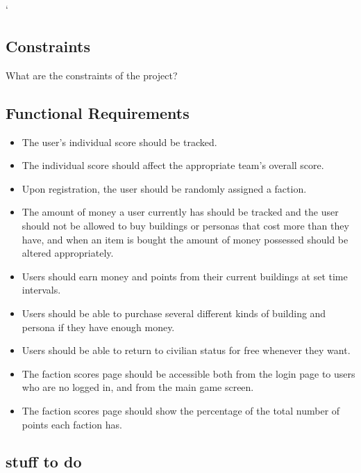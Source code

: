 `\documentclass{sig-alt-release2}
\begin{document}
\subsection{Constraints}

What are the constraints of the project?\\

\subsection{Functional Requirements}

\begin{itemize}

\item The user's individual score should be tracked.

\item The individual score should affect the appropriate team's overall score.

\item Upon registration, the user should be randomly assigned a faction.

\item The amount of money a user currently has should be tracked and the user should not be allowed to buy buildings or personas that cost more than they have, and when an item is bought the amount of money possessed should be altered appropriately.

\item Users should earn money and points from their current buildings at set time intervals.

\item Users should be able to purchase several different kinds of building and persona if they have enough money.

\item Users should be able to return to civilian status for free whenever they want.

\item The faction scores page should be accessible both from the login page to users who are no logged in, and from the main game screen.

\item The faction scores page should show the percentage of the total number of points each faction has.

\end{itemize}

\subsection{stuff to do} 
\end{document}
